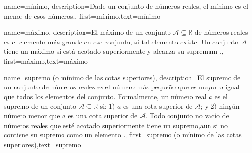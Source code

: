 
{
	name=mínimo,
	description={Dado un conjunto de números reales, el mínimo es el menor de esos números.},
	first={mínimo},text={mínimo}
}


{name=máximo,
     description={El máximo de un conjunto $\mathcal{A} \subseteq \mathbb{R}$ 
	 de números reales es el elemento más grande en ese conjunto, si tal elemento existe. Un conjunto $\mathcal{A}$ 
	 tiene un máximo si está acotado superiormente y alcanza su \gls{supremum} \cite[Sec.~1.4]{RudinBookPrinciplesMatheAnalysis}.},
 first={máximo},text={máximo}
}

{name=supremo (o mínimo de las cotas superiores),
	description={El supremo de un conjunto de números reales es 
		el número más pequeño que es mayor o igual que todos los elementos del conjunto. Formalmente, un número real 
		$a$ es el supremo de un conjunto $\mathcal{A} \subseteq \mathbb{R}$ si: 1) $a$ 
		es una cota superior de $\mathcal{A}$; y 2) ningún número menor que $a$ es una cota superior de $\mathcal{A}$. 
		Todo conjunto no vacío de números reales que esté acotado superiormente tiene un supremo,aun si no contiene su supremo como un elemento \cite[Sec.~1.4]{RudinBookPrinciplesMatheAnalysis}.},
	first={supremo (o mínimo de las cotas superiores)},text={supremo}
}

%



